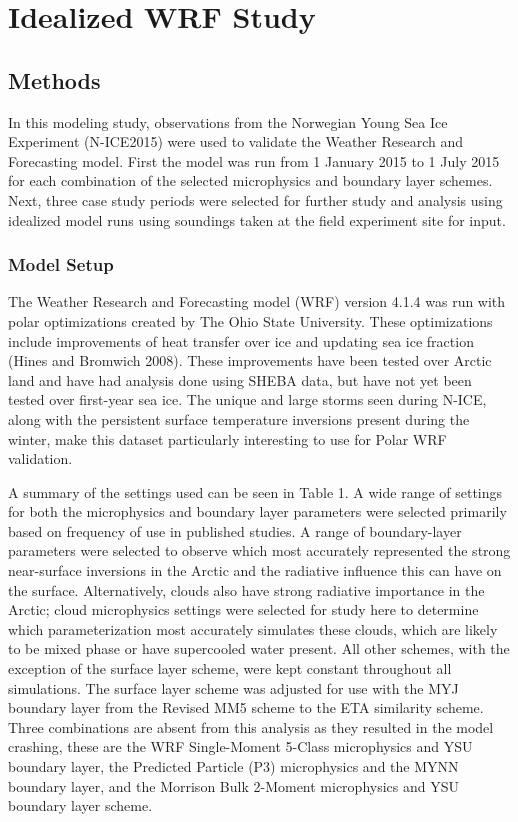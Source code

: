 \chapter{Idealized WRF Study}


\section{Methods}

In this modeling study, observations from the Norwegian Young Sea Ice Experiment (N-ICE2015) were used to validate the Weather Research and Forecasting model. First the model was run from 1 January 2015 to 1 July 2015 for each combination of the selected microphysics and boundary layer schemes. Next, three case study periods were selected for further study and analysis using idealized model runs using soundings taken at the field experiment site for input.

\subsection{Model Setup}

The Weather Research and Forecasting model (WRF) version 4.1.4 was run with polar optimizations created by The Ohio State University. These optimizations include improvements of heat transfer over ice and updating sea ice fraction (Hines and Bromwich 2008). These improvements have been tested over Arctic land and have had analysis done using SHEBA data, but have not yet been tested over first-year sea ice. The unique and large storms seen during N-ICE, along with the persistent surface temperature inversions present during the winter, make this dataset particularly interesting to use for Polar WRF validation.

A summary of the settings used can be seen in Table 1. A wide range of settings for both the microphysics and boundary layer parameters were selected primarily based on frequency of use in published studies. A range of boundary-layer parameters were selected to observe which most accurately represented the strong near-surface inversions in the Arctic and the radiative influence this can have on the surface. Alternatively, clouds also have strong radiative importance in the Arctic; cloud microphysics settings were selected for study here to determine which parameterization most accurately simulates these clouds, which are likely to be mixed phase or have supercooled water present. All other schemes, with the exception of the surface layer scheme, were kept constant throughout all simulations. The surface layer scheme was adjusted for use with the MYJ boundary layer from the Revised MM5 scheme to the ETA similarity scheme. Three combinations are absent from this analysis as they resulted in the model crashing, these are the WRF Single-Moment 5-Class microphysics and YSU boundary layer, the Predicted Particle (P3) microphysics and the MYNN boundary layer, and the Morrison Bulk 2-Moment microphysics and YSU boundary layer scheme.

